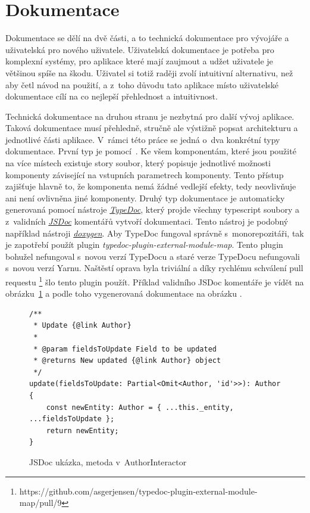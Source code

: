 \section{Dokumentace}
\label{sc:documentation}
Dokumentace se dělí na dvě části, a to technická dokumentace pro vývojáře a uživatelská pro nového uživatele. Uživatelská dokumentace je potřeba pro komplexní systémy, pro aplikace které mají zaujmout a udžet uživatele je většinou spíše na škodu. Uživatel si totiž raději zvolí intuitivní alternativu, než aby četl návod na použití, a z~toho důvodu tato aplikace místo uživatelské dokumentace cílí na co nejlepší přehlednost a intuitivnost.

Technická dokumentace na druhou stranu je nezbytná pro další vývoj aplikace. Taková dokumentace musí přehledně, stručně ale výstižně popsat architekturu a jednotlivé části aplikace. V~rámci této práce se jedná o~dva konkrétní typy dokumentace. První typ je pomocí~. Ke všem komponentám, které jsou použité na více místech existuje story soubor, který popisuje jednotlivé možnosti komponenty závisející na vstupních parametrech komponenty. Tento přístup zajišťuje hlavně to, že komponenta nemá žádné vedlejší efekty, tedy neovlivňuje ani není ovlivněna jiné komponenty. Druhý typ dokumentace je automaticky generovaná pomocí nástroje \href{https://typedoc.org/}{\emph{TypeDoc}}, který projde všechny typescript soubory a z~validních \href{https://jsdoc.app/}{\emph{JSDoc}} komentářů vytvoří dokumentaci. Tento nástroj je podobný například nástroji \href{http://www.doxygen.nl/}{\emph{doxygen}}. Aby TypeDoc fungoval správně s~monorepozitáři, tak je zapotřebí použít plugin \emph{typedoc-plugin-external-module-map}. Tento plugin bohužel nefungoval s~novou verzí TypeDocu a staré verze TypeDocu nefungovali s~novou verzí Yarnu. Naštěstí oprava byla triviální a díky rychlému schválení pull requestu \footnote{https://github.com/asgerjensen/typedoc-plugin-external-module-map/pull/9} šlo tento plugin použít. Příklad validního JSDoc komentáře je vídět na obrázku~\ref{code:jsdoc} a podle toho vygenerovaná dokumentace na obrázku \cite{fig:documentation_example}.

\begin{figure}[h!]
    \centering
    \begin{verbatim}
/**
 * Update {@link Author}
 *
 * @param fieldsToUpdate Field to be updated
 * @returns New updated {@link Author} object
 */
update(fieldsToUpdate: Partial<Omit<Author, 'id'>>): Author {
    const newEntity: Author = { ...this._entity, ...fieldsToUpdate };
    return newEntity;
}
    \end{verbatim}
    \caption{JSDoc ukázka, metoda v~AuthorInteractor}
    \label{code:jsdoc}
\end{figure}

